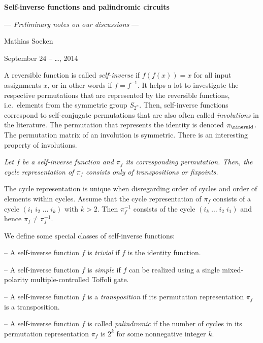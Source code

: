 \def\slug{\hbox{\kern1.5pt\vrule width2.5pt height6pt depth1.5pt\kern1.5pt}}
\def\slugonright{\vrule width0pt\nobreak\hfill\slug}

\centerline{\bf Self-inverse functions and palindromic circuits}
\centerline{--- {\it Preliminary notes on our discussions\/} ---}
\centerline{Mathias Soeken}
\centerline{September 24 -- \dots, 2014}

\bigskip
\bigskip

\enspace A reversible function is
called {\it self-inverse\/} if $f(f(x))=x$ for all input assignments $x$, or in
other words if $f=f^{-1}$.  It helps a lot to investigate the respective
permutations that are represented by the reversible functions, i.e.~elements
from the symmetric group $S_{2^n}$.  Then, self-inverse functions correspond to
self-conjugate permutations that are also often called {\it involutions\/} in
the literature.  The permutation that represents the identity is denoted
$\pi_{\rm id}$.  The permutation matrix of an involution is symmetric.  There is
an interesting property of involutions.

\smallskip {} \sl Let $f$ be a self-inverse function and
$\pi_f$ its corresponding permutation.  Then, the cycle representation of
$\pi_f$ consists only of transpositions or fixpoints. \rm

\smallskip{} The cycle representation is unique when
disregarding order of cycles and order of elements within cycles.  Assume that
the cycle representation of $\pi_f$ consists of a cycle $(i_1\; i_2\; \ldots \;
i_k)$ with $k>2$.  Then $\pi_f^{-1}$ consists of the cycle $(i_k \; \ldots \;
i_2 \; i_1)$ and hence $\pi_f\neq \pi_f^{-1}$. \qquad\slug

\smallskip\noindent We define some special classes of self-inverse functions:

\item{--} A self-inverse function $f$ is {\it trivial\/} if $f$ is the identity
function.
\item{--} A self-inverse function $f$ is {\it simple\/} if $f$ can be realized
using a single mixed-polarity multiple-controlled Toffoli gate.
\item{--} A self-inverse function $f$ is a {\it transposition\/} if its
permutation representation $\pi_f$ is a transposition.
\item{--} A self-inverse function $f$ is called {\it palindromic\/} if the
number of cycles in its permutation representation $\pi_f$ is $2^k$ for some
nonnegative integer $k$. 

